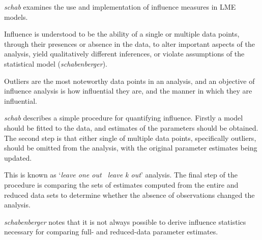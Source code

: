 \documentclass[12pt, a4paper]{report}
\theoremstyle{plain}
\theoremstyle{definition}
\theoremstyle{remark}
\begin{document}
\emph{schab} examines the use and implementation of
influence measures in LME models.

Influence is understood to be the ability of a single or multiple
data points, through their presences or absence in the data, to
alter important aspects of the analysis, yield qualitatively
different inferences, or violate assumptions of the statistical
model (\textit{schabenberger}).

Outliers are the most noteworthy data points in an analysis, and
an objective of influence analysis is how influential they are,
and the manner in which they are influential.

\emph{schab} describes a simple procedure for quantifying
influence. Firstly a model should be fitted to the data, and
estimates of the parameters should be obtained. The second step is
that either single of multiple data points, specifically outliers,
should be omitted from the analysis, with the original parameter
estimates being updated. 

This is known as `\textit{leave one out \ leave k
	out}' analysis. The final step of the procedure is comparing the
sets of estimates computed from the entire and reduced data sets
to determine whether the absence of observations changed the
analysis.

\textit{schabenberger} notes that it is not always possible to
derive influence statistics necessary for comparing full- and
reduced-data parameter estimates. 

%
%

\end{document}
